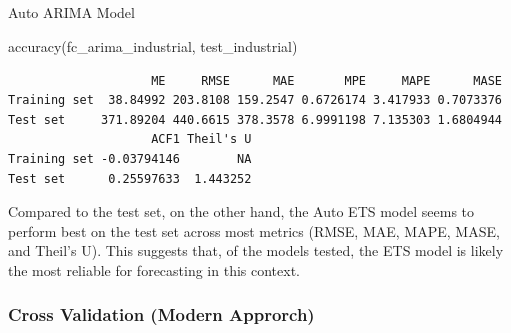 \documentclass[
  letterpaper,
  DIV=11,
  numbers=noendperiod]{scrartcl}
\makeatletter
\let\oldsubparagraph\subparagraph
\renewcommand{\subparagraph}{
    \@ifstar
      \xxxSubParagraphStar
      \xxxSubParagraphNoStar
  }
\newcommand{\xxxSubParagraphStar}[1]{\oldsubparagraph*{#1}\mbox{}}
\newcommand{\xxxSubParagraphNoStar}[1]{\oldsubparagraph{#1}\mbox{}}
\newenvironment{Shaded}{\begin{snugshade}}{\end{snugshade}}
\newcommand{\FunctionTok}[1]{\textcolor[rgb]{0.28,0.35,0.67}{#1}}
\newcommand{\NormalTok}[1]{\textcolor[rgb]{0.00,0.23,0.31}{#1}}
\makeatother
\begin{document}
\subparagraph{Auto ARIMA Model}\label{auto-arima-model-1}

\begin{Shaded}
\begin{Highlighting}[]
\FunctionTok{accuracy}\NormalTok{(fc\_arima\_industrial, test\_industrial)}
\end{Highlighting}
\end{Shaded}

\begin{verbatim}
                    ME     RMSE      MAE       MPE     MAPE      MASE
Training set  38.84992 203.8108 159.2547 0.6726174 3.417933 0.7073376
Test set     371.89204 440.6615 378.3578 6.9991198 7.135303 1.6804944
                    ACF1 Theil's U
Training set -0.03794146        NA
Test set      0.25597633  1.443252
\end{verbatim}

Compared to the test set, on the other hand, the Auto ETS model seems to
perform best on the test set across most metrics (RMSE, MAE, MAPE, MASE,
and Theil's U). This suggests that, of the models tested, the ETS model
is likely the most reliable for forecasting in this context.

\subsubsection{Cross Validation (Modern
Approrch)}\label{cross-validation-modern-approrch}
\end{document}
